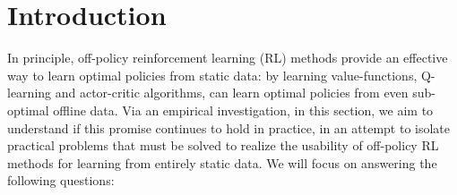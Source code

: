 \section{Introduction}

In principle, off-policy reinforcement learning (RL) methods provide an effective way to learn optimal policies from static data: by learning value-functions, Q-learning and actor-critic algorithms, can learn optimal policies from even sub-optimal offline data. Via an empirical investigation, in this section, we aim to understand if this promise continues to hold in practice, in an attempt to isolate practical problems that must be solved to realize the usability of off-policy RL methods for learning from entirely static data. We will focus on answering the following questions: 



